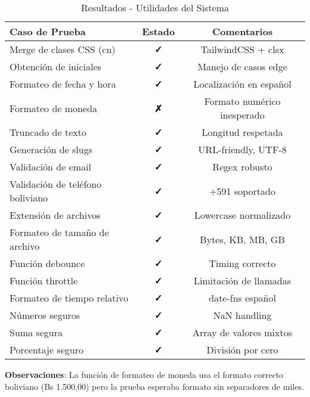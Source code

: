 \documentclass[12pt,a4paper]{article}
\begin{document}
\begin{table}[H]
\centering
\caption{Resultados - Utilidades del Sistema}
\begin{tabular}{@{}p{6cm}cc@{}}
\toprule
\textbf{Caso de Prueba} & \textbf{Estado} & \textbf{Comentarios} \\
\midrule
Merge de clases CSS (cn) & \textcolor{successgreen}{\textbf{✓}} & TailwindCSS + clsx \\
Obtención de iniciales & \textcolor{successgreen}{\textbf{✓}} & Manejo de casos edge \\
Formateo de fecha y hora & \textcolor{successgreen}{\textbf{✓}} & Localización en español \\
Formateo de moneda & \textcolor{dangerred}{\textbf{✗}} & Formato numérico inesperado \\
Truncado de texto & \textcolor{successgreen}{\textbf{✓}} & Longitud respetada \\
Generación de slugs & \textcolor{successgreen}{\textbf{✓}} & URL-friendly, UTF-8 \\
Validación de email & \textcolor{successgreen}{\textbf{✓}} & Regex robusto \\
Validación de teléfono boliviano & \textcolor{successgreen}{\textbf{✓}} & +591 soportado \\
Extensión de archivos & \textcolor{successgreen}{\textbf{✓}} & Lowercase normalizado \\
Formateo de tamaño de archivo & \textcolor{successgreen}{\textbf{✓}} & Bytes, KB, MB, GB \\
Función debounce & \textcolor{successgreen}{\textbf{✓}} & Timing correcto \\
Función throttle & \textcolor{successgreen}{\textbf{✓}} & Limitación de llamadas \\
Formateo de tiempo relativo & \textcolor{successgreen}{\textbf{✓}} & date-fns español \\
Números seguros & \textcolor{successgreen}{\textbf{✓}} & NaN handling \\
Suma segura & \textcolor{successgreen}{\textbf{✓}} & Array de valores mixtos \\
Porcentaje seguro & \textcolor{successgreen}{\textbf{✓}} & División por cero \\
\bottomrule
\end{tabular}
\end{table}

\textbf{Observaciones}: La función de formateo de moneda usa el formato correcto boliviano (Bs 1.500,00) pero la prueba esperaba formato sin separadores de miles.
\end{document}
